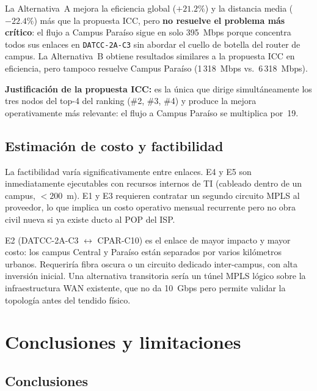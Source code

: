 \documentclass[12pt, a4paper]{article}
\newenvironment{hallazgo}{%
    \begin{mdframed}[backgroundcolor=verdeFondo, linecolor=verde,
        linewidth=2pt, leftline=true, rightline=false,
        topline=false, bottomline=false,
        innerleftmargin=10pt, innerrightmargin=10pt,
        innertopmargin=6pt, innerbottommargin=6pt,
        skipabove=6pt, skipbelow=6pt]
    \small
}{\end{mdframed}}
\begin{document}
La Alternativa~A mejora la eficiencia global ($+21.2\%$) y la distancia media
($-22.4\%$) más que la propuesta ICC, pero \textbf{no resuelve el problema más
crítico}: el flujo a Campus Paraíso sigue en solo 395~Mbps porque concentra
todos sus enlaces en \texttt{DATCC-2A-C3} sin abordar el cuello de botella
del router de campus. La Alternativa~B obtiene resultados similares a la
propuesta ICC en eficiencia, pero tampoco resuelve Campus Paraíso
(1\,318~Mbps vs.\ 6\,318~Mbps).

\begin{hallazgo}
\textbf{Justificación de la propuesta ICC:} es la única que dirige
simultáneamente los tres nodos del top-4 del ranking (\#2, \#3, \#4) y
produce la mejora operativamente más relevante: el flujo a Campus Paraíso
se multiplica por~19.
\end{hallazgo}

\subsection{Estimación de costo y factibilidad}

La factibilidad varía significativamente entre enlaces. E4 y E5 son
inmediatamente ejecutables con recursos internos de TI (cableado dentro de
un campus, $< 200$~m). E1 y E3 requieren contratar un segundo circuito MPLS
al proveedor, lo que implica un costo operativo mensual recurrente pero no
obra civil nueva si ya existe ducto al POP del ISP.

E2 (DATCC-2A-C3 $\leftrightarrow$ CPAR-C10) es el enlace de mayor impacto
y mayor costo: los campus Central y Paraíso están separados por varios
kilómetros urbanos. Requeriría fibra oscura o un circuito dedicado
inter-campus, con alta inversión inicial. Una alternativa transitoria sería
un túnel MPLS lógico sobre la infraestructura WAN existente, que no da
10~Gbps pero permite validar la topología antes del tendido físico.

\section{Conclusiones y limitaciones}

\subsection{Conclusiones}
\end{document}
